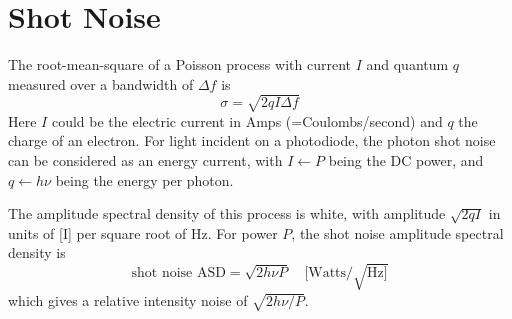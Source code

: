 \section{Shot Noise}
The root-mean-square of a Poisson process with current $I$ and quantum
$q$ measured over a bandwidth of $\Delta f$ is 
$$\sigma = \sqrt{2 q I \Delta f}$$ 
Here $I$ could be the electric current in Amps (=Coulombs/second) and
$q$ the charge of an electron.  For light incident on a photodiode,
the photon shot noise can be considered as an energy current, with
$I\leftarrow P$ being the DC power, and $q\leftarrow h\nu$ being the
energy per photon.

The amplitude spectral density of this process is white, with
amplitude $\sqrt{2qI}$ in units of [I] per square root of Hz.
For power $P$, the shot noise amplitude spectral density is 
\begin{equation}
\text{shot noise ASD} = \sqrt{2 h\nu P}\quad [\text{Watts}/\sqrt{\text{Hz}]}
\label{eq:shotnoise-asd}
\end{equation}
which gives a relative intensity noise of $\sqrt{2 h\nu/P}$.

